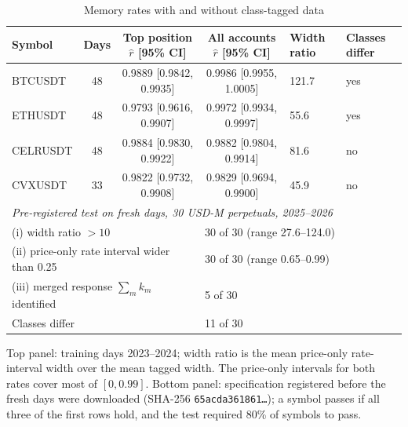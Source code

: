 \begin{table}[t]\centering\small
\begin{threeparttable}
\caption{Memory rates with and without class-tagged data}\label{p1:tab:disc}
\setlength{\tabcolsep}{3pt}
\begin{tabular}{lcccp{}p{}}
\toprule
Symbol & Days & Top position $\hat r$ [95\% CI] & All accounts $\hat r$ [95\% CI] & Width ratio & Classes differ\\
\midrule
BTCUSDT & 48 & 0.9889 [0.9842, 0.9935] & 0.9986 [0.9955, 1.0005] & 121.7 & yes\\
ETHUSDT & 48 & 0.9793 [0.9616, 0.9907] & 0.9972 [0.9934, 0.9997] & 55.6 & yes\\
CELRUSDT & 48 & 0.9884 [0.9830, 0.9922] & 0.9882 [0.9804, 0.9914] & 81.6 & no\\
CVXUSDT & 33 & 0.9822 [0.9732, 0.9908] & 0.9829 [0.9694, 0.9900] & 45.9 & no\\
\midrule
\multicolumn{6}{l}{\emph{Pre-registered test on fresh days, 30 USD-M perpetuals, 2025--2026}}\\
\multicolumn{3}{l}{(i) width ratio $>10$} & \multicolumn{3}{l}{30 of 30 (range 27.6--124.0)}\\
\multicolumn{3}{l}{(ii) price-only rate interval wider than 0.25} & \multicolumn{3}{l}{30 of 30 (range 0.65--0.99)}\\
\multicolumn{3}{l}{(iii) merged response $\sum_mk_m$ identified} & \multicolumn{3}{l}{5 of 30}\\
\multicolumn{3}{l}{Classes differ} & \multicolumn{3}{l}{11 of 30}\\
\bottomrule
\end{tabular}
\begin{tablenotes}\footnotesize\item Top panel: training days 2023--2024; width ratio is the mean price-only rate-interval width over the mean tagged width. The price-only intervals for both rates cover most of $[0,0.99]$. Bottom panel: specification registered before the fresh days were downloaded (SHA-256 \texttt{65acda361861\ldots}); a symbol passes if all three of the first rows hold, and the test required 80\% of symbols to pass. \end{tablenotes}
\end{threeparttable}
\end{table}

